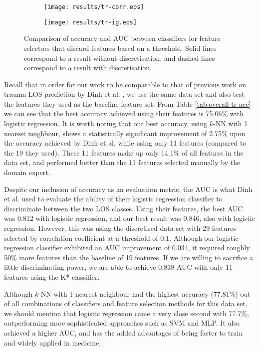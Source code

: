 \documentclass{article}
\begin{document}
\begin{figure}[htbp]
\begin{subfigure}{1.1\textwidth}
\texttt{[image: results/tr-corr.eps]}
\caption{}
\label{fig:tr-threshold-corr}
\end{subfigure}

\begin{subfigure}{1.1\textwidth}
\texttt{[image: results/tr-ig.eps]}
\caption{}
\label{fig:tr-threshold-ig}
\end{subfigure}
\caption[]{Comparison of accuracy and AUC between classifiers for feature selectors that discard features based on a threshold. Solid lines correspond to a result without discretisation, and dashed lines correspond to a result with discretisation.}
\label{fig:tr-threshold}
\end{figure}

Recall that in order for our work to be comparable to that of previous work on
trauma LOS prediction by Dinh et al. \cite{Dinh2013a}, we use the same data
set and also test the features they used as the baseline feature set.
From Table \ref{tab:overall-tr-acc} we can see that
the best accuracy achieved using their features is 75.06\% with logistic
regression.
It is worth noting that our best accuracy, using $k$-NN with 1
nearest neighbour, shows a statistically significant improvement of 2.75\% upon
the accuracy achieved by Dinh et al.
while using only 11 features (compared to the 19 they used). These 11 features
make up only 14.1\% of all features in the data set, and performed better than
the 11 features selected manually by the domain expert.

Despite our inclusion of accuracy as an evaluation metric, the AUC is what Dinh
et al. \cite{Dinh2013a}
used to evaluate the ability of their logistic regression classifier to
discriminate between the two LOS classes. Using their features, the best AUC
was 0.812 with logistic regression, and our best result was 0.846, also with
logistic regression. However, this was using the discretised data set with 29
features selected by correlation coefficient at a threshold of 0.1.
Although our logistic regression classifier exhibited an AUC improvement of
0.034, it required roughly 50\% more features than the baseline of 19 features.
If we are willing to sacrifice a little discriminating power, we are able to
achieve 0.838 AUC with only 11 features using the K* classifier.

Although $k$-NN with 1 nearest neighbour had the highest accuracy (77.81\%) out
of all combinations of classifiers and feature selection methods for this data
set, we should mention that logistic regression came a very close second with
77.7\%, outperforming more sophisticated approaches such as SVM and MLP. It
also achieved a higher AUC, and has the added advantages of being faster to
train and widely applied in medicine.
\end{document}
